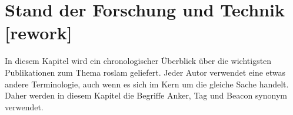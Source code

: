 \begin{comment}
------------------------------------------------------------------------------------------
\end{comment}
\chapter{Stand der Forschung und Technik [rework]}

In diesem Kapitel wird ein chronologischer Überblick über die wichtigsten Publikationen zum Thema \Gls{roslam} geliefert. Jeder Autor verwendet eine etwas andere Terminologie, auch wenn es sich im Kern um die gleiche Sache handelt. Daher werden in diesem Kapitel die Begriffe Anker, Tag und Beacon synonym verwendet.


\begin{comment}
------------------------------------------------------------------------------------------
- \cite{kantor2002preliminary}
- Preliminary results in range-only localization and mapping (189)
- Section 2
	- Statische Lokalisierung
		- Vorherige Sensorinformationen und Positionsschätzung werden nicht genutzt.
		- Annahme: Position der Beacons ist bekannt und fix.
	- Markovian probability grids
	- Mit fehlerfreien Messungen ist die Positionsbestimmung trivial
	- Entfernungsmessung mit einem erwarteten Fehler von 6 feet, also 1,82 meter. (1Fuß==30cm)
	- 1. Characterizing Range Measurements
		- Erstellen einer Verteilungsfunktion für die Entfernungsmessung
		- experimentel bestimmt
		- Diskrete Messungen in einem Set {0,6,12,...,50}
	- 2. Creating Probability Grids
		- Für jede Zelle des Grid wird die Wahrscheinlichkeit mittels der PDF berechnet.
	- 3. Combine Probability Grids
		- Multiply in a pointwise manner
		- scale the result so that the sum over the squares is one.
		- Aus den kombinierten Ergebnisgrid kann die schätzte Position mittels der gewichteten Durchschnitt der Gridzellen berechnet werden.
		- Covariance Matrix lässt sich auch bestimmen
	- Durchschnittlich geschätzer Fehler lag ab 1,62 feet bei einem geschätzen Entfernungsmess Fehler von 5.82 bis 7.18 feet.
- Section 3
	- Beacon positionen sind bekannt
	- Vorherige Positionsschätzung und Odometry daten werden verwendet.
	- Positionsverfolgung mittels Kalman und Monte Carlo
	- Kalman
		- Initiale Positionsschätzung wie in Section 2, jedoch mit drei Beacons.
		- Approximieren eines ringförmigen Gauß-Verteilung um die geschätzte Position.
		- Füttern eines entsprechenden EKF mit den Parametern
	- Monte Carlo
		- Verwendet die pdf aus Section 2 um die Partikels zu gewichten.
	- Durchschnittliche Geschätzter Fehler
		- EKT: 0,73 feet
		- MC: 0,93 feet
- Section 4
	- Lokalisieren in einer Umgebung mit unsicheren beacon positionen
		- Approximately known, good but not perfect
		- crude measurement or estimate location on blueprint
	- SLAM mit EKF
		- State ist die Robot- und Beacon-Position
		- Error: init 5.13 feet, end 0.77 feet
\end{comment}
